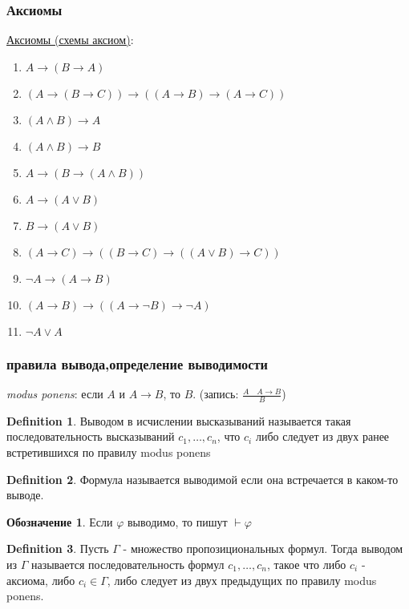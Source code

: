 \documentclass[a4paper]{article}
\theoremstyle{plain}
\theoremstyle{remark}
\theoremstyle{definition}
\newtheorem{definition}{Definition}
\newtheorem*{designation}{Обозначение}
\begin{document}
\subsubsection{Аксиомы}
\underline{Аксиомы (схемы аксиом)}:
\begin{enumerate}
	\item $A \rightarrow (B \rightarrow A)$
	\item $(A \rightarrow (B \rightarrow C)) \rightarrow ((A \rightarrow B)\rightarrow(A\rightarrow C))$
	\item $(A \land B)\rightarrow A$
	\item $(A \land B)\rightarrow B$
	\item $A \rightarrow (B \rightarrow (A \land B))$
	\item $A \rightarrow (A \lor B)$
	\item $B \rightarrow (A \lor B)$
	\item $(A \rightarrow C) \rightarrow ((B \rightarrow C) \rightarrow ((A \lor B) \rightarrow C))$
	\item $\lnot A \rightarrow (A \rightarrow B)$
	\item $(A \rightarrow B) \rightarrow (( A \rightarrow \lnot B) \rightarrow \lnot A)$
	\item $\lnot A \lor A$
\end{enumerate}
\subsubsection{правила вывода,определение выводимости}
\emph{modus ponens}: если $A$ и $A \rightarrow B$, то $B$. (запись: $\frac{A\quad A \rightarrow B}{B}$)

\begin{definition}
	Выводом в исчислении высказываний называется такая последовательность высказываний $c_1, \ldots, c_n$, что $c_i$ либо следует из двух ранее встретившихся по правилу modus ponens
\end{definition}

\begin{definition}
	Формула называется выводимой если она встречается в каком-то выводе.
\end{definition}
\begin{designation}
	Если $\varphi$ выводимо, то пишут $\vdash \varphi$
\end{designation}

\begin{definition}
	Пусть $\Gamma$ - множество пропозициональных формул. Тогда выводом из $\Gamma$ называется последовательность формул $c_1, \ldots, c_n$, такое что либо $c_i$ - аксиома, либо $c_i \in \Gamma$, либо следует из двух предыдущих по правилу modus ponens. 
\end{definition}
\end{document}

